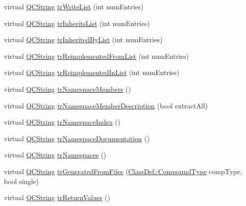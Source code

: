 \begin{DoxyCompactItemize}
\item 
virtual \hyperlink{class_q_c_string}{Q\-C\-String} \hyperlink{class_translator_chinesetraditional_af4bb0330da918087ca9a91baef309e79}{tr\-Write\-List} (int num\-Entries)
\item 
virtual \hyperlink{class_q_c_string}{Q\-C\-String} \hyperlink{class_translator_chinesetraditional_a0e30aa3e1bc1c329e36088e46173cd95}{tr\-Inherits\-List} (int num\-Entries)
\item 
virtual \hyperlink{class_q_c_string}{Q\-C\-String} \hyperlink{class_translator_chinesetraditional_ae3d0b686686bbad5d0d0c00dd659d05c}{tr\-Inherited\-By\-List} (int num\-Entries)
\item 
virtual \hyperlink{class_q_c_string}{Q\-C\-String} \hyperlink{class_translator_chinesetraditional_a3e195179c98c6c78494949095f1c367d}{tr\-Reimplemented\-From\-List} (int num\-Entries)
\item 
virtual \hyperlink{class_q_c_string}{Q\-C\-String} \hyperlink{class_translator_chinesetraditional_ae31066cc2f6b74862f2f86e16aeb4a55}{tr\-Reimplemented\-In\-List} (int num\-Entries)
\item 
virtual \hyperlink{class_q_c_string}{Q\-C\-String} \hyperlink{class_translator_chinesetraditional_a493f2f99fac12e30e02ee39d5cea79cb}{tr\-Namespace\-Members} ()
\item 
virtual \hyperlink{class_q_c_string}{Q\-C\-String} \hyperlink{class_translator_chinesetraditional_abe422143a54da2cad8ae364b45d70eb8}{tr\-Namespace\-Member\-Description} (bool extract\-All)
\item 
virtual \hyperlink{class_q_c_string}{Q\-C\-String} \hyperlink{class_translator_chinesetraditional_a5b154bcb92d74bf36e005d6709709f71}{tr\-Namespace\-Index} ()
\item 
virtual \hyperlink{class_q_c_string}{Q\-C\-String} \hyperlink{class_translator_chinesetraditional_adace66ae174642555c6277121c712568}{tr\-Namespace\-Documentation} ()
\item 
virtual \hyperlink{class_q_c_string}{Q\-C\-String} \hyperlink{class_translator_chinesetraditional_ab509be45cc3774f62f622ccca0ea7e20}{tr\-Namespaces} ()
\item 
virtual \hyperlink{class_q_c_string}{Q\-C\-String} \hyperlink{class_translator_chinesetraditional_a597c39ad456b55dde01d47ad487a1c0b}{tr\-Generated\-From\-Files} (\hyperlink{class_class_def_a768a6f0a6fd7e9087ff7971abbcc3f36}{Class\-Def\-::\-Compound\-Type} comp\-Type, bool single)
\item 
virtual \hyperlink{class_q_c_string}{Q\-C\-String} \hyperlink{class_translator_chinesetraditional_a2b22c2ac68083d678d14769da085be63}{tr\-Return\-Values} ()

\end{DoxyCompactItemize}
